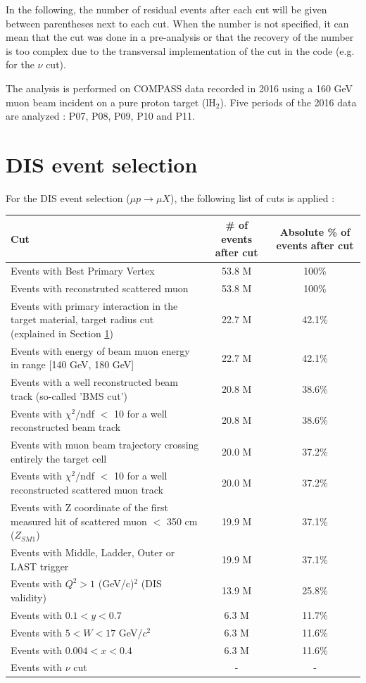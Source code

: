 In the following, the number of residual events after each cut will be given between parentheses next to each cut.
When the number is not specified, it can mean that the cut was done in a pre-analysis or that the recovery of the number is too complex due to the transversal implementation of the cut in the code (e.g. for the $\nu$ cut).

The analysis is performed on COMPASS data recorded in 2016 using a 160 GeV muon beam incident on a pure proton target (lH$_2$).
Five periods of the 2016 data are analyzed : P07, P08, P09, P10 and P11.


\section{DIS event selection}

For the DIS event selection ($\mu p \rightarrow \mu X$), the following list of cuts is applied :

\begin{table}[!h]
  \centering
  \begin{tabular}{lcc}
    \hline
    \hline
     Cut & \# of events after cut & Absolute \% of events after cut  \\
    \hline
    \hline
    Events with Best Primary Vertex & 53.8 M & 100\% \\
    Events with reconstruted scattered muon & 53.8 M & 100\% \\
    Events with primary interaction in the target material, target radius cut (explained in Section \ref{}) & 22.7 M & 42.1\% \\
    Events with energy of beam muon energy in range [140 GeV, 180 GeV] & 22.7 M & 42.1\% \\
    Events with a well reconstructed beam track (so-called 'BMS cut') & 20.8 M & 38.6\% \\
    Events with $\chi^2$/ndf $<$ 10 for a well reconstructed beam track & 20.8 M & 38.6\% \\
    Events with muon beam trajectory crossing entirely the target cell & 20.0 M & 37.2\% \\
    Events with $\chi^2$/ndf $<$ 10 for a well reconstructed scattered muon track & 20.0 M & 37.2\% \\
    Events with Z coordinate of the first measured hit of scattered muon $<$ 350 cm ($Z_{SM1}$) & 19.9 M & 37.1\% \\
    Events with Middle, Ladder, Outer or LAST trigger & 19.9 M & 37.1\% \\
    Events with $Q^2>1$ (GeV/c)$^2$ (DIS validity) & 13.9 M & 25.8\% \\
    Events with $0.1 < y < 0.7$ & 6.3 M & 11.7\% \\
    Events with $5 < W < 17$ GeV/$c^2$ & 6.3 M & 11.6\% \\
    Events with $0.004 < x < 0.4$ & 6.3 M & 11.6\% \\
    Events with $\nu$ cut & - & - \\
    \hline
    \hline
  \end{tabular}
\end{table}

